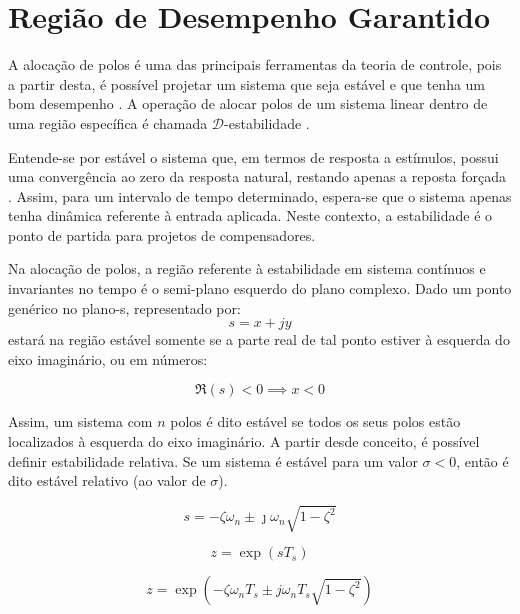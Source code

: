 \chapter{Região de Desempenho Garantido}

A alocação de polos é uma das principais ferramentas da teoria de controle, pois a partir desta, é possível projetar um sistema que seja estável e que tenha um bom desempenho \cite{ROSINOVA2014}. A operação de alocar polos de um sistema linear dentro de uma região específica é chamada $\mathscr{D}$-estabilidade \cite{WISNIEWSKI2017}.

Entende-se por estável o sistema que, em termos de resposta a estímulos, possui uma convergência ao zero da resposta natural, restando apenas a reposta forçada \cite{NISE2011}. Assim, para um intervalo de tempo determinado, espera-se que o sistema apenas tenha dinâmica referente à entrada aplicada. Neste contexto, a estabilidade é o ponto de partida para projetos de compensadores.

Na alocação de polos, a região referente à estabilidade em sistema contínuos e invariantes no tempo é o semi-plano esquerdo do plano complexo. Dado um ponto genérico no plano-s, representado por:
\begin{equation}
  s = x + jy\label{PontoPlanoS}
\end{equation}
estará na região estável somente se a parte real de tal ponto estiver à esquerda do eixo imaginário, ou em números:

\begin{equation}
  \Re{(s)} < 0 \implies x < 0
\end{equation}

Assim, um sistema com $n$ polos é dito estável se todos os seus polos estão localizados à esquerda do eixo imaginário. A partir desde conceito, é possível definir estabilidade relativa. Se um sistema é estável para um valor $\sigma < 0$, então é dito estável relativo (ao valor de $\sigma$). 

\begin{equation}
  s = -\zeta\omega_n \pm \jmath\omega_n \sqrt {1-\zeta^2} \label{eq:PontoPlanoS2}
\end{equation}

\begin{equation}
  z = \exp(sT_s)\label{eq:TransformacaoSZ}
\end{equation}

\begin{equation}
  z = \exp{\left(-\zeta\omega_nT_s \pm j\omega_nT_s\sqrt{1-\zeta^2}\right)}\label{eq:PontoPlanoZ}
\end{equation}


